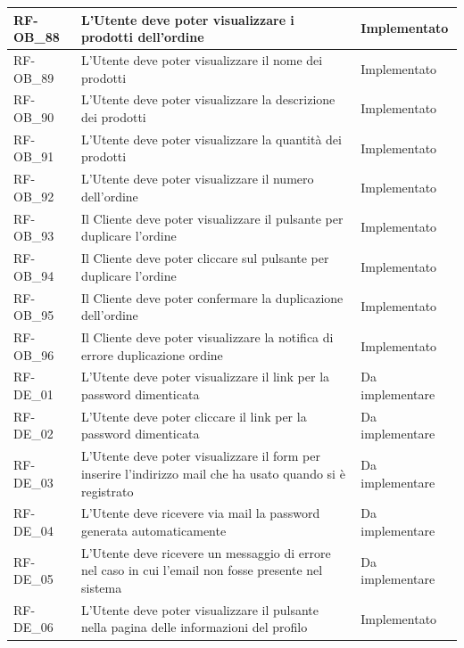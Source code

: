 \begin{longtable}{|>{\raggedright}p{}|>{\raggedright\arraybackslash}p{}|>{\raggedright\arraybackslash}p{}|}
	\hline
	RF-OB\_88 \hypertarget{rf-ob_88} & L'Utente deve poter visualizzare i prodotti dell'ordine & Implementato \\
	\hline
	RF-OB\_89 \hypertarget{rf-ob_89} & L'Utente deve poter visualizzare il nome dei prodotti & Implementato \\
	\hline
	RF-OB\_90 \hypertarget{rf-ob_90} & L'Utente deve poter visualizzare la descrizione dei prodotti & Implementato \\
	\hline
	RF-OB\_91 \hypertarget{rf-ob_91} & L'Utente deve poter visualizzare la quantità dei prodotti & Implementato \\
	\hline
	RF-OB\_92 \hypertarget{rf-ob_92} & L'Utente deve poter visualizzare il numero dell'ordine & Implementato \\
	\hline
	RF-OB\_93 \hypertarget{rf-ob_93} & Il Cliente deve poter visualizzare il pulsante per duplicare l'ordine & Implementato \\
	\hline
	RF-OB\_94 \hypertarget{rf-ob_94} & Il Cliente deve poter cliccare sul pulsante per duplicare l'ordine & Implementato \\
	\hline
	RF-OB\_95 \hypertarget{rf-ob_95} & Il Cliente deve poter confermare la duplicazione dell'ordine & Implementato \\
	\hline
	RF-OB\_96 \hypertarget{rf-ob_96} & Il Cliente deve poter visualizzare la notifica di errore duplicazione ordine & Implementato \\
	\hline
	RF-DE\_01 \hypertarget{rf-de_1} & L'Utente deve poter visualizzare il link per la password dimenticata & Da implementare \\
	\hline
	RF-DE\_02 \hypertarget{rf-de_2} & L'Utente deve poter cliccare il link per la password dimenticata & Da implementare \\
	\hline
	RF-DE\_03 \hypertarget{rf-de_3} & L'Utente deve poter visualizzare il form per inserire l'indirizzo mail che ha usato quando si è registrato & Da implementare \\
	\hline
	RF-DE\_04 \hypertarget{rf-de_4} & L'Utente deve ricevere via mail la password generata automaticamente & Da implementare \\
	\hline
	RF-DE\_05 \hypertarget{rf-de_5} & L'Utente deve ricevere un messaggio di errore nel caso in cui l'email non fosse presente nel sistema & Da implementare \\
	\hline
	RF-DE\_06 \hypertarget{rf-de_6} & L'Utente deve poter visualizzare il pulsante \vr{Elimina Account} nella pagina delle informazioni del profilo & Implementato \\

\end{longtable}

